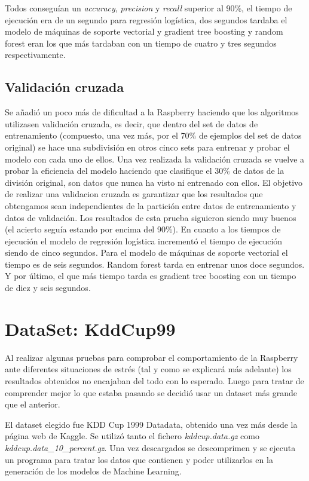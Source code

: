 \documentclass[a4paper, 12pt]{book}
\begin{document}
Todos conseguían un \textit{accuracy}, \textit{precision} y \textit{recall} superior al 90\%, el tiempo de ejecución era de un segundo para regresión logística, dos segundos tardaba el modelo de máquinas de soporte vectorial y gradient tree boosting y random forest eran los que más tardaban con un tiempo de cuatro y tres segundos respectivamente.

\subsection{Validación cruzada}

Se añadió un poco más de dificultad a la Raspberry haciendo que los algoritmos utilizasen validación cruzada, es decir, que dentro del set de datos de entrenamiento (compuesto, una vez más, por el 70\% de ejemplos del set de datos original) se hace una subdivisión en otros cinco sets para entrenar y probar el modelo con cada uno de ellos. 
Una vez realizada la validación cruzada se vuelve a probar la eficiencia del modelo haciendo que clasifique el 30\% de datos de la división original, son datos que nunca ha visto ni entrenado con ellos. El objetivo de realizar una validacion cruzada es garantizar que los resultados que obtengamos sean independientes de la partición entre datos de entrenamiento y datos de validación. Los resultados de esta prueba siguieron siendo muy buenos (el acierto seguía estando por encima del 90\%). 
En cuanto a los tiempos de ejecución el modelo de regresión logística incrementó el tiempo de ejecución siendo de cinco segundos. Para el modelo de máquinas de soporte vectorial el tiempo es de seis segundos. Random forest tarda en entrenar unos doce segundos. Y por último, el que más tiempo tarda es gradient tree boosting con un tiempo de diez y seis segundos. 


\section{DataSet: KddCup99}
\label{subsec:dataset_kddcup99}

Al realizar algunas pruebas para comprobar el comportamiento de la Raspberry ante diferentes situaciones de estrés (tal y como se explicará más adelante) los resultados obtenidos no encajaban del todo con lo esperado. Luego para tratar de comprender mejor lo que estaba pasando se decidió usar un dataset más grande que el anterior.

El dataset elegido fue KDD Cup 1999 Datadata\cite{DataSetOccupancy}, obtenido una vez más desde la página web de Kaggle. Se utilizó tanto el fichero \textit{kddcup.data.gz} como \textit{kddcup.data\_10\_percent.gz}. Una vez descargados se descomprimen y se ejecuta un programa para tratar los datos que contienen y poder utilizarlos en la generación de los modelos de Machine Learning.
\end{document}
